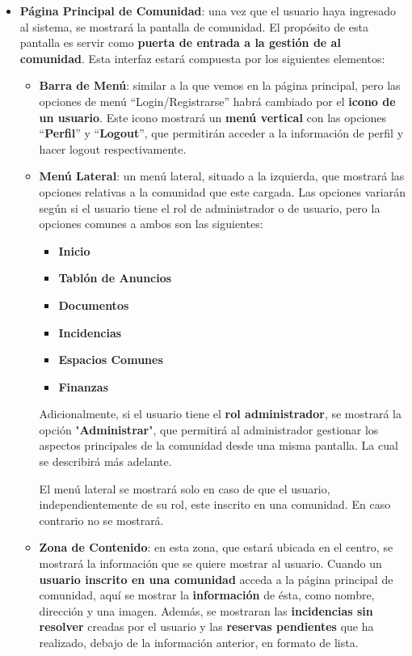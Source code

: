 \begin{appendices}
\begin{itemize}
	
	\item \textbf{Página Principal de Comunidad}: una vez que el usuario haya ingresado al sistema, se mostrará la pantalla de comunidad. El propósito de esta pantalla es servir como \textbf{puerta de entrada a la gestión de al comunidad}. Esta interfaz estará compuesta por los siguientes elementos:
	
	\begin{itemize}
		\item \textbf{Barra de Menú}: similar a la que vemos en la página principal, pero las opciones de menú ``Login/Registrarse''  habrá cambiado por el \textbf{icono de un usuario}. Este icono mostrará un \textbf{menú vertical} con las opciones ``\textbf{Perfil}'' y ``\textbf{Logout}'', que permitirán acceder a la información de perfil y hacer \gls{logout} respectivamente.
		
		\item \textbf{Menú Lateral}: un menú lateral, situado a la izquierda, que mostrará las opciones relativas a la comunidad que este cargada. Las opciones variarán según si el usuario tiene el rol de administrador o de usuario, pero la opciones comunes a ambos son las siguientes: 
		
		\begin{itemize}
			\item \textbf{Inicio}
			\item \textbf{Tablón de Anuncios}
			\item \textbf{Documentos}
			\item \textbf{Incidencias}
			\item \textbf{Espacios Comunes}
			\item \textbf{Finanzas}
		\end{itemize}
	
		 
		 Adicionalmente, si el usuario tiene el \textbf{rol administrador}, se mostrará la opción "\textbf{Administrar}", que permitirá al administrador gestionar los aspectos principales de la comunidad desde una misma pantalla. La cual se describirá más adelante.
		 
		El menú lateral se mostrará solo en caso de que el usuario, independientemente de su rol, este inscrito en una comunidad. En caso contrario no se mostrará.
		
		\item \textbf{Zona de Contenido}: en esta zona, que estará ubicada en el centro, se mostrará la información que se quiere mostrar al usuario. Cuando un \textbf{usuario inscrito en una comunidad} acceda a la página principal de comunidad, aquí se mostrar la \textbf{información} de ésta, como nombre, dirección y una imagen. Además, se mostraran las \textbf{incidencias sin resolver} creadas por el usuario y las \textbf{reservas pendientes} que ha realizado, debajo de la información anterior, en formato de lista. 
		

\end{itemize}
\end{itemize}
\end{appendices}
